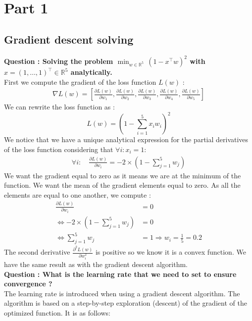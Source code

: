 \section{Part 1}
\subsection{Gradient descent solving}
\textbf{Question : Solving the problem $\min_{w \in \mathbb{R}^5}\, (1 - x^\top w)^2$ with $x = (1, \ldots, 1)^\top \in \mathbb{R}^5$  analytically.} \\
First we compute the gradient of the loss function $L(w)$ :
\begin{align*}
	\nabla L(w) = \left[
	\frac{\partial L(w)}{\partial w_1},
	\frac{\partial L(w)}{\partial w_2},
	\frac{\partial L(w)}{\partial w_3},
	\frac{\partial L(w)}{\partial w_4},
	\frac{\partial L(w)}{\partial w_5}		 
	\right]
\end{align*}
We can rewrite the loss function as : 
\begin{equation*}
	L(w) = \left( 1-\sum^5_{i=1}x_iw_i \right)^2
\end{equation*}
We notice that we have a unique analytical expression for the partial derivatives of the loss function considering that $\forall i : x_i=1$: 
\begin{align*}
	\forall i	: \quad \frac{\partial L(w)}{\partial w_i} = - 2\times \left(1-\sum^5_{j=1} w_j\right)
\end{align*}
We want the gradient equal to zero as it means we are at the minimum of the function. We want the mean of the gradient elements equal to zero. As all the elements are equal to one another, we compute :
\begin{align*}
	\frac{\partial L(w)}{\partial w_i}&=0 \\
	\Leftrightarrow - 2\times \left(1-\sum^5_{j=1} w_j\right)&=0 \\ 
	\Leftrightarrow \sum^5_{j=1} w_j&=1 \Rightarrow w_i=\frac{1}{5}=0.2
\end{align*}
The second derivative $\frac{\partial^2 L(w)}{\partial w_i^2}$ is positive so we know it is a convex function. We have the same result as with the gradient descent algorithm.  \\


\textbf{Question : What is the learning rate that we need to set to ensure convergence ?} \\
The learning rate is introduced when using a gradient descent algorithm. The algorithm is based on a step-by-step exploration (descent) of the gradient of the optimized function. It is as follows: \\

